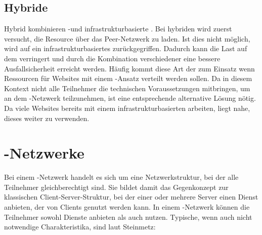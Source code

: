 
\subsection{Hybride \cdns}
Hybrid \cdns kombinieren \pTp-\cdns und infrastrukturbasierte \cdns. Bei hybriden \cdns wird zuerst versucht, die Resource über das Peer-Netzwerk zu laden. Ist dies nicht möglich, wird auf ein infrastrukturbasiertes \cdn zurückgegriffen. Dadurch kann die Last auf dem \cdn verringert und durch die Kombination verschiedener \cdns eine bessere Ausfallsicherheit erreicht werden. Häufig kommt diese Art der \cdns zum Einsatz wenn Ressourcen für Websites mit einem \pTp-Ansatz verteilt werden sollen. Da in diesem Kontext nicht alle Teilnehmer die technischen Voraussetzungen mitbringen, um an dem \pTp-Netzwerk teilzunehmen, ist eine entsprechende alternative Lösung nötig. Da viele Websites bereits mit einem infrastrukturbasierten \cdn arbeiten, liegt nahe, dieses weiter zu verwenden.

\section{\pTp-Netzwerke} \label{pTp}
Bei einem \pTp-Netzwerk handelt es sich um eine Netzwerkstruktur, bei der alle Teilnehmer gleichberechtigt sind. Sie bildet damit das Gegenkonzept zur klassischen Client-Server-Struktur, bei der einer oder mehrere Server einen Dienst anbieten, der von Clients genutzt werden kann. In einem \pTp-Netzwerk können die Teilnehmer sowohl Dienste anbieten als auch nutzen. Typische, wenn auch nicht notwendige Charakteristika, sind laut Steinmetz\cite{p2pBook2005}:

